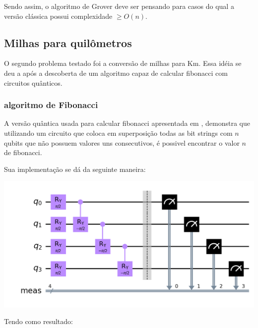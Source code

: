 \documentclass{article}
\begin{document}
Sendo assim, o algoritmo de Grover deve ser pensando para casos do qual a versão clássica possui complexidade $\ge O(n)$.


\subsection{Milhas para quilômetros} \label{conversion}

O segundo problema testado foi a conversão de milhas para Km. Essa idéia se deu a após a descoberta de um algoritmo capaz de calcular fibonacci com circuitos quânticos.

\subsubsection{algoritmo de Fibonacci}

A versão quântica usada para calcular fibonacci apresentada em \cite{gilliam2020canonical}, demonstra que utilizando um circuito que coloca em superposição todas as bit strings com $n$ qubits que não possuem valores uns consecutivos, é possivel encontrar o valor $n$ de fibonacci.

Sua implementação se dá da seguinte maneira:

\begin{center}
	\includegraphics[scale=0.3]{fibonacci-circuit.png}
	\label{fig:fibonacci-circuit}
\end{center}

Tendo como resultado:
\end{document}
